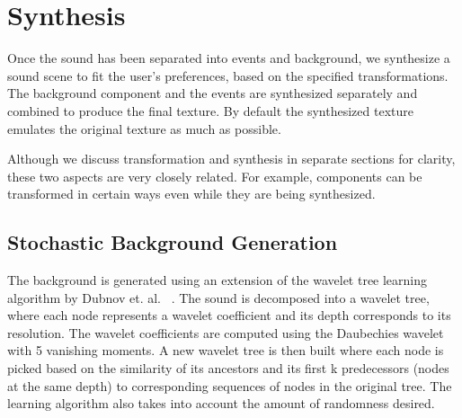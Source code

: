 \documentclass{acmsiggraph}               %
\begin{document}


\section{Synthesis}

Once the sound has been separated into events and background, we synthesize a sound scene to fit 
the user's preferences, based on the specified transformations. The background 
component and the events are synthesized separately and combined to produce the 
final texture. By default the synthesized texture emulates the original texture as much 
as possible.

Although we discuss transformation and synthesis in separate sections for clarity, these two 
aspects are very closely related. For example, components can be transformed in certain ways even 
while they are being synthesized. 

\subsection{Stochastic Background Generation}

The background is generated using an extension of the wavelet tree 
learning algorithm by Dubnov et. al. ~. The sound is 
decomposed into a wavelet tree, where each node represents a wavelet 
coefficient and its depth corresponds to its resolution.  The wavelet 
coefficients are computed using the Daubechies wavelet with 5 vanishing 
moments. A new wavelet tree is then built where each node is picked 
based on the similarity of its ancestors and its first k predecessors 
(nodes at the same depth) to corresponding sequences of nodes in the 
original tree. The learning algorithm also takes into account the amount of 
randomness desired.
\end{document}

